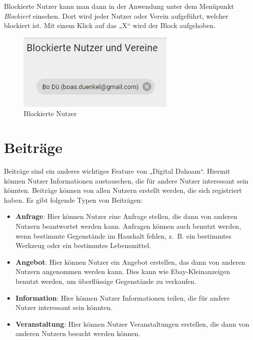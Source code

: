 Blockierte Nutzer kann man dann in der Anwendung unter dem Menüpunkt \textit{Blockiert} einsehen.
Dort wird jeder Nutzer oder Verein aufgeführt, welcher blockiert ist.
Mit einem Klick auf das „X“ wird der Block aufgehoben.

\begin{figure}[ht!]
  \begin{centering}
    \includegraphics[width=.5\textwidth]{figures/implementation/blocked.png}
    \caption{Blockierte Nutzer}
    \label{fig:blocked}
  \end{centering}
\end{figure}

\section{Beiträge}
\label{sec:contributions}

Beiträge sind ein anderes wichtiges Feature von „Digital Dahoam“.
Hiermit können Nutzer Informationen austauschen, die für andere Nutzer interessant sein könnten.
Beiträge können von allen Nutzern erstellt werden, die sich registriert haben.
Es gibt folgende Typen von Beiträgen:

\begin{itemize}
  \item \textbf{Anfrage}: Hier können Nutzer eine Anfrage stellen, die dann von anderen Nutzern beantwortet werden kann. Anfragen können auch benutzt werden, wenn bestimmte Gegenstände im Haushalt fehlen, z. B. ein bestimmtes Werkzeug oder ein bestimmtes Lebensmittel.
  \item \textbf{Angebot}: Hier können Nutzer ein Angebot erstellen, das dann von anderen Nutzern angenommen werden kann. Dies kann wie Ebay-Kleinanzeigen benutzt werden, um überflüssige Gegenstände zu verkaufen.
  \item \textbf{Information}: Hier können Nutzer Informationen teilen, die für andere Nutzer interessant sein könnten.
  \item \textbf{Veranstaltung}: Hier können Nutzer Veranstaltungen erstellen, die dann von anderen Nutzern besucht werden können.
\end{itemize}

